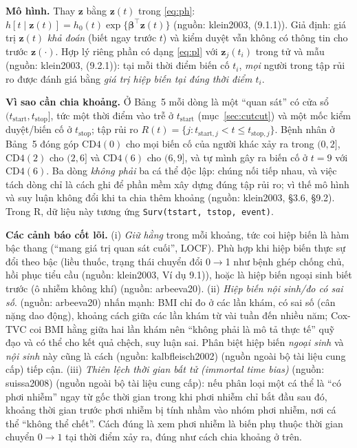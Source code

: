 \documentclass[11pt,a4paper,notitlepage]{report}
\newcommand{\tr}{^{\top}}
\providecommand{\nguon}[1]{(nguồn: #1)}
\begin{document}
\begin{bosung}
\textbf{Mô hình.} Thay $\bm z$ bằng $\bm z(t)$ trong \eqref{eq:ph}: $h[t\mid\bm z(t)]=h_0(t)\exp\{\bm\beta\tr\bm z(t)\}$ \nguon{klein2003, (9.1.1)}. Giả định: giá trị $\bm z(t)$ \emph{khả đoán} (biết ngay trước $t$) và kiểm duyệt vẫn không có thông tin cho trước $\bm z(\cdot)$.
Hợp lý riêng phần có dạng \eqref{eq:pl} với $\bm z_j(t_i)$ trong tử và mẫu \nguon{klein2003, (9.2.1)}: tại mỗi thời điểm biến cố $t_i$, \emph{mọi} người trong tập rủi ro được đánh giá bằng \emph{giá trị hiệp biến tại đúng thời điểm $t_i$}.

\textbf{Vì sao cần chia khoảng.} Ở Bảng~5 mỗi dòng là một ``quan sát'' có cửa sổ $(t_{\mathrm{start}},t_{\mathrm{stop}}]$, tức một thời điểm vào trễ ở $t_{\mathrm{start}}$ (mục~\ref{sec:cutcut}) và một mốc kiểm duyệt/biến cố ở $t_{\mathrm{stop}}$;
tập rủi ro $R(t)=\{j:t_{\mathrm{start},j}<t\le t_{\mathrm{stop},j}\}$. Bệnh nhân ở Bảng~5 đóng góp $\mathrm{CD4}(0)$ cho mọi biến cố của người khác xảy ra trong $(0,2]$, $\mathrm{CD4}(2)$ cho $(2,6]$ và $\mathrm{CD4}(6)$ cho $(6,9]$,
và tự mình gây ra biến cố ở $t=9$ với $\mathrm{CD4}(6)$. Ba dòng \emph{không phải} ba cá thể độc lập: chúng nối tiếp nhau, và việc tách dòng chỉ là cách ghi để phần mềm xây dựng đúng tập rủi ro;
vì thế mô hình và suy luận không đổi khi ta chia thêm khoảng \nguon{klein2003, \S3.6, \S9.2}. Trong R, dữ liệu này tương ứng \texttt{Surv(tstart, tstop, event)}.

\textbf{Các cảnh báo cốt lõi.}
(i) \emph{Giữ hằng} trong mỗi khoảng, tức coi hiệp biến là hàm bậc thang (``mang giá trị quan sát cuối'', LOCF). Phù hợp khi hiệp biến thực sự đổi theo bậc (liều thuốc, trạng thái chuyển đổi 0$\to$1 như bệnh ghép chống chủ, hồi phục tiểu cầu \nguon{klein2003, Ví dụ 9.1}), hoặc là hiệp biến ngoại sinh biết trước (ô nhiễm không khí) \nguon{arbeeva20}.
(ii) \emph{Hiệp biến nội sinh/đo có sai số}. \nguon{arbeeva20} nhấn mạnh: BMI chỉ đo ở các lần khám, có sai số (cân nặng dao động), khoảng cách giữa các lần khám từ vài tuần đến nhiều năm; Cox-TVC coi BMI hằng giữa hai lần khám
nên ``không phải là mô tả thực tế'' quỹ đạo và có thể cho kết quả chệch, suy luận sai. Phân biệt hiệp biến \emph{ngoại sinh} và \emph{nội sinh} này cũng là cách \nguon{kalbfleisch2002} (nguồn ngoài bộ tài liệu cung cấp) tiếp cận.
(iii) \emph{Thiên lệch thời gian bất tử (immortal time bias)} \nguon{suissa2008} (nguồn ngoài bộ tài liệu cung cấp): nếu phân loại một cá thể là ``có phơi nhiễm'' ngay từ gốc thời gian trong khi phơi nhiễm chỉ bắt đầu sau đó, khoảng thời gian trước phơi nhiễm bị tính nhầm vào nhóm phơi nhiễm,
nơi cá thể ``không thể chết''. Cách đúng là xem phơi nhiễm là biến phụ thuộc thời gian chuyển $0\to1$ tại thời điểm xảy ra, đúng như cách chia khoảng ở trên.


\end{bosung}
\end{document}
